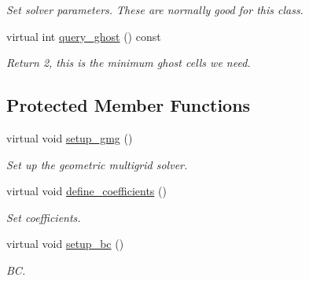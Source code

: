 \begin{DoxyCompactItemize}
\begin{DoxyCompactList}\small\item\em Set solver parameters. These are normally good for this class. \end{DoxyCompactList}\item 
virtual int \hyperlink{classpoisson__staircase__gmg_a79497b4800df4af179e99402552222dd}{query\+\_\+ghost} () const 
\begin{DoxyCompactList}\small\item\em Return 2, this is the minimum ghost cells we need. \end{DoxyCompactList}\end{DoxyCompactItemize}
\subsection*{Protected Member Functions}
\begin{DoxyCompactItemize}
\item 
virtual void \hyperlink{classpoisson__staircase__gmg_a77d02bd6525bb6129d26072814476dc7}{setup\+\_\+gmg} ()
\begin{DoxyCompactList}\small\item\em Set up the geometric multigrid solver. \end{DoxyCompactList}\item 
virtual void \hyperlink{classpoisson__staircase__gmg_a035669fdc5e8d0bd2f1bf01fd629e418}{define\+\_\+coefficients} ()
\begin{DoxyCompactList}\small\item\em Set coefficients. \end{DoxyCompactList}\item 
virtual void \hyperlink{classpoisson__staircase__gmg_a7bcf740cd539f62c5810e351f60938c0}{setup\+\_\+bc} ()
\begin{DoxyCompactList}\small\item\em BC. \end{DoxyCompactList}\end{DoxyCompactItemize}
